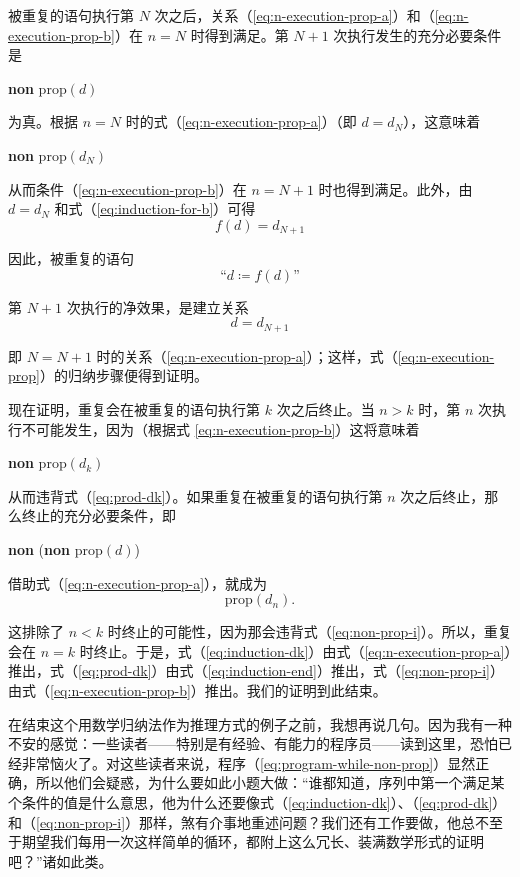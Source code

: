 被重复的语句执行第 $N$ 次之后，关系（\ref{eq:n-execution-prop-a}）和（\ref{eq:n-execution-prop-b}）在 $n = N$ 时得到满足。第 $N + 1$ 次执行发生的充分必要条件是
\begin{center}
	\textbf{non} prop$(d)$
\end{center}

\noindent
为真。根据 $n = N$ 时的式（\ref{eq:n-execution-prop-a}）（即 $d = d_N$），这意味着
\begin{center}
	\textbf{non} prop$(d_N)$
\end{center}

\noindent
从而条件（\ref{eq:n-execution-prop-b}）在 $n = N + 1$ 时也得到满足。此外，由 $d = d_N$ 和式（\ref{eq:induction-for-b}）可得
$$
f(d) = d_{N + 1}
$$

\noindent
因此，被重复的语句
$$
\text{``}d \coloneq f(d)\text{''}
$$

\noindent
第 $N + 1$ 次执行的净效果，是建立关系
$$
d = d_{N + 1}
$$

\noindent
即 $N = N + 1$ 时的关系（\ref{eq:n-execution-prop-a}）；这样，式（\ref{eq:n-execution-prop}）的归纳步骤便得到证明。

现在证明，重复会在被重复的语句执行第 $k$ 次之后终止。当 $n > k$ 时，第 $n$ 次执行不可能发生，因为（根据式 \ref{eq:n-execution-prop-b}）这将意味着
\begin{center}
	\textbf{non} prop$(d_k)$
\end{center}

\noindent
从而违背式（\ref{eq:prod-dk}）。如果重复在被重复的语句执行第 $n$ 次之后终止，那么终止的充分必要条件，即
\begin{center}
	\textbf{non} (\textbf{non} prop$(d)$)
\end{center}

\noindent
借助式（\ref{eq:n-execution-prop-a}），就成为
\begin{equation}
	\label{eq:induction-end}
	\text{prop}(d_n).
\end{equation}

这排除了 $n < k$ 时终止的可能性，因为那会违背式（\ref{eq:non-prop-i}）。所以，重复会在 $n = k$ 时终止。于是，式（\ref{eq:induction-dk}）由式（\ref{eq:n-execution-prop-a}）推出，式（\ref{eq:prod-dk}）由式（\ref{eq:induction-end}）推出，式（\ref{eq:non-prop-i}）由式（\ref{eq:n-execution-prop-b}）推出。我们的证明到此结束。

在结束这个用数学归纳法作为推理方式的例子之前，我想再说几句。因为我有一种不安的感觉：一些读者——特别是有经验、有能力的程序员——读到这里，恐怕已经非常恼火了。对这些读者来说，程序（\ref{eq:program-while-non-prop}）显然正确，所以他们会疑惑，为什么要如此小题大做：“谁都知道，序列中第一个满足某个条件的值是什么意思，他为什么还要像式（\ref{eq:induction-dk}）、（\ref{eq:prod-dk}）和（\ref{eq:non-prop-i}）那样，煞有介事地重述问题？我们还有工作要做，他总不至于期望我们每用一次这样简单的循环，都附上这么冗长、装满数学形式的证明吧？”诸如此类。

